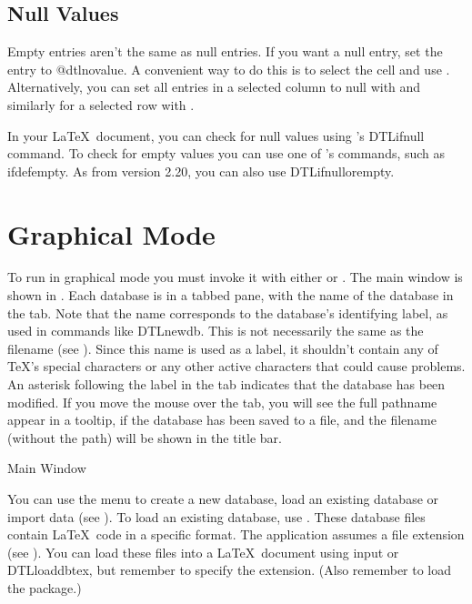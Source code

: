 \section{Null Values}\label{sec:null}

Empty entries aren't the same as null entries. If you want 
a null entry, set the entry to \gls{@dtlnovalue}. 
A convenient way to do this is to select the cell and use
. Alternatively, you can set all entries in 
a selected column to null with 
and similarly for a selected row with .

In your \LaTeX\ document, you can check for null values using 
's \gls{DTLifnull} command. To check for empty 
values you can use one of 's commands, such as 
\gls{ifdefempty}. As from  version 2.20, you
can also use \gls{DTLifnullorempty}.

\chapter{Graphical Mode}\label{sec:gui}

To run  in graphical mode you must invoke it with either 
 or . The main window
is shown in . Each database is
in a tabbed pane, with the name of the database in the
tab. Note that the name corresponds to the database's identifying
label, as used in commands like \gls{DTLnewdb}. This is 
not necessarily the same as the filename (see ). 
Since this name is used as a label, it shouldn't contain any of 
\TeX's special characters or any other active characters that could 
cause problems.  An asterisk \code{*} following the label in the tab 
indicates that the database has been modified. If you move the mouse
over the tab, you will see the full pathname appear in a tooltip,
if the database has been saved to a  file,
and the filename (without the path) will be shown in the title bar.

 {%
 }
 {Main Window}

 You can use the  menu to create a new 
database, load an existing database or import data (see 
). To load an existing database, use
. These database files contain \LaTeX\ code
in a specific format. The  application assumes 
a  file extension (see ).
You can load these files into a \LaTeX\ document using 
\gls{input} or \gls{DTLloaddbtex}, but remember to specify 
the  extension. (Also remember to load the 
 package.)

